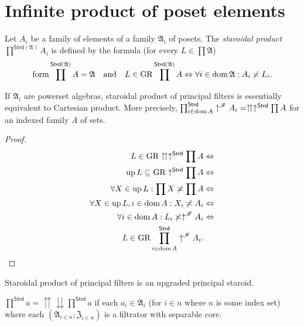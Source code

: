 \section{Infinite product of poset elements}

Let $A_{i}$ be a family of elements of
a family $\mathfrak{A}_{i}$ of posets. The \emph{staroidal product}
$\prod^{\mathsf{Strd}(\mathfrak{A})}A_{i}$ is defined by the formula
(for every $L\in\prod\mathfrak{A}$)
\[
\operatorname{form}\prod^{\mathsf{Strd}(\mathfrak{A})}A=\mathfrak{A}\hspace{1em}\text{and}\hspace{1em}L\in\operatorname{GR}\prod^{\mathsf{Strd}(\mathfrak{A})}A\Leftrightarrow\forall i\in\operatorname{dom}\mathfrak{A}:A_{i}\not\asymp L_{i}.
\]

\begin{prop}
If $\mathfrak{A}_{i}$ are powerset algebras, staroidal product of
principal filters is essentially equivalent to Cartesian product.
More precisely, $\prod_{i\in\operatorname{dom} A}^{\mathsf{Strd}}\uparrow^{\mathscr{F}}A_{i}=\upuparrows\uparrow^{\mathsf{Strd}}\prod A$
for an indexed family $A$ of sets.\end{prop}
\begin{proof}
~
\begin{align*}
L\in\operatorname{GR}\upuparrows\uparrow^{\mathsf{Strd}}\prod A & \Leftrightarrow\\
\operatorname{up} L\subseteq\operatorname{GR}\uparrow^{\mathsf{Strd}}\prod A & \Leftrightarrow\\
\forall X\in\operatorname{up} L:\prod X\not\asymp\prod A & \Leftrightarrow\\
\forall X\in\operatorname{up} L,i\in\operatorname{dom} A:X_{i}\not\asymp A_{i} & \Leftrightarrow\\
\forall i\in\operatorname{dom} A:L_{i}\not\asymp\uparrow^{\mathscr{F}}A_{i} & \Leftrightarrow\\
L\in\operatorname{GR}\prod_{i\in\operatorname{dom} A}^{\mathsf{Strd}}\uparrow^{\mathscr{F}}A_{i}.
\end{align*}
\end{proof}
\begin{cor}
Staroidal product of principal filters is an upgraded principal staroid.\end{cor}
\begin{prop}
\label{up-down-fcd}$\prod^{\mathsf{Strd}}a=\upuparrows\downdownarrows\prod^{\mathsf{Strd}}a$
if each $a_{i}\in\mathfrak{A}_{i}$ (for $i\in n$ where $n$ is some
index set) where each $(\mathfrak{A}_{i\in n};\mathfrak{Z}_{i\in n})$
is a filtrator with separable core.\end{prop}
